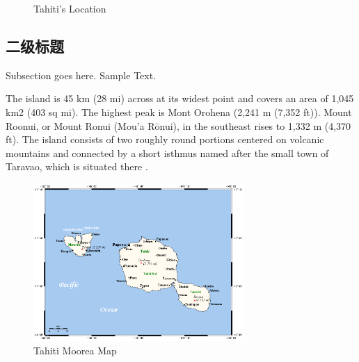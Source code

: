 \documentclass[12pt,journal,onecolumn]{IEEEtran}
\begin{document}
\begin{figure}[!h]
	\centering
	\quad
	\quad
	\caption{Tahiti's Location}
	\label{tahitilocation}
\end{figure}

\subsection{二级标题}

Subsection goes here. Sample Text.

The island is 45 km (28 mi) across at its widest point and covers an area of 1,045 km2 (403 sq mi). The highest peak is Mont Orohena (2,241 m (7,352 ft)). Mount Roonui, or Mount Ronui (Mou'a Rōnui), in the southeast rises to 1,332 m (4,370 ft). The island consists of two roughly round portions centered on volcanic mountains and connected by a short isthmus named after the small town of Taravao, which is situated there \cite{tahitiworldatlas}.

\begin{figure}[!h]
  \centering
  \includegraphics[height=6cm]{figures/TahitiMooreaMap.png}
  \caption{Tahiti Moorea Map}
  \label{tmmap}
\end{figure}
\end{document}
